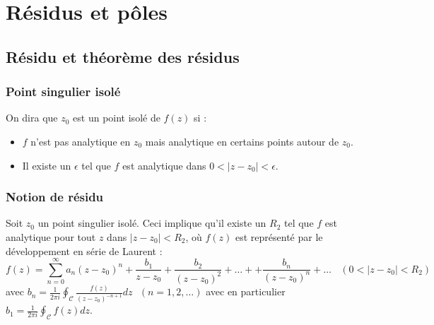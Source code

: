 \chapter{Résidus et p\^oles}

\section{Résidu et théorème des résidus}

\subsection{Point singulier isolé}
On dira que $z_0$ est un point isolé de $f(z)$ si :
\begin{itemize}
	\item $f$ n'est pas analytique en $z_0$ mais analytique en certains points
	      autour de $z_0$.
	\item Il existe un $\epsilon$ tel que $f$ est analytique dans $0<|z-z_0|<
	      \epsilon$.
\end{itemize}
	
	
\subsection{Notion de résidu}
Soit $z_0$ un point singulier isolé. Ceci implique qu'il existe un $R_2$ tel 
que $f$ est analytique pour tout $z$ dans $|z-z_0| < R_2$, où $f(z)$ est 
représenté par le développement en série de Laurent :
\begin{equation}
	f(z) = \sum_{n=0}^\infty a_n(z-z_0)^n + \frac{b_1}{z-z_0}+\frac{b_2}{(z-z_0)^2}
	+ \dots + + \frac{b_n}{(z-z_0)^n} + \dots\ \ \ \ (0<|z-z_0|<R_2)
\end{equation}
avec $b_n = \frac{1}{2\pi i}\oint_\mathcal{C}\frac{f(z)}{(z-z_0)^{-n+1}}dz\ \
\ (n=1,2,\dots)$ avec en particulier $b_1 = \frac{1}{2\pi i}\oint_\mathcal{C}
f(z) dz$.\\
	
\ \\
	
